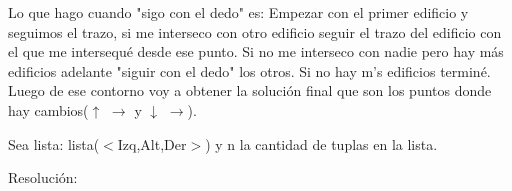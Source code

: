 \documentclass{article}
\begin{document}
Lo que hago cuando "sigo con el dedo" es: \newline
Empezar con el primer edificio y seguimos el trazo, si me interseco con otro edificio seguir el trazo del edificio con el que me intersequ\'e desde ese punto. \newline
Si no me interseco con nadie pero hay m\'as edificios adelante "siguir con el dedo" los otros. Si no hay m\a's edificios termin\'e.\newline
Luego de ese contorno voy a obtener la soluci\'on final que son los puntos donde hay cambios($\uparrow$ $\longrightarrow$ y $\downarrow$ $\longrightarrow$). \newline

\newpage
Sea lista: lista($<$Izq,Alt,Der$>$) y n la cantidad de tuplas en la lista.

{\noindent \Huge Resoluci\'on:}
\newline \newline
\end{document}
